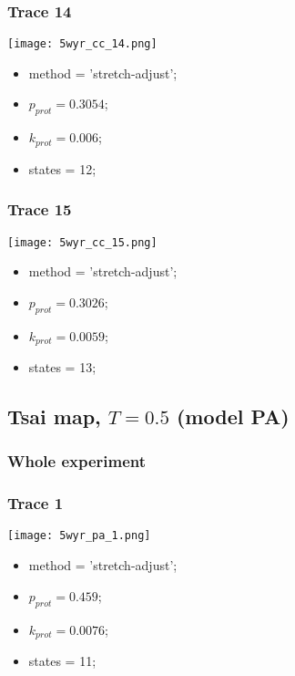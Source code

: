 \subsubsection{Trace 14}
\begin{minipage}[c]{0.7\textwidth}
    \texttt{[image: 5wyr\_cc\_14.png]}
\end{minipage}
\hfill
\begin{minipage}[c]{0.45\textwidth}
    \begin{itemize}
        \item method = 'stretch-adjust';
        \item $p_{prot}=0.3054$;
        \item $k_{prot}=0.006$;
        \item states = 12;
    \end{itemize}
\end{minipage}

\subsubsection{Trace 15}
\begin{minipage}[c]{0.7\textwidth}
    \texttt{[image: 5wyr\_cc\_15.png]}
\end{minipage}
\hfill
\begin{minipage}[c]{0.45\textwidth}
    \begin{itemize}
        \item method = 'stretch-adjust';
        \item $p_{prot}=0.3026$;
        \item $k_{prot}=0.0059$;
        \item states = 13;
    \end{itemize}
\end{minipage}

\subsection{Tsai map, $T=0.5$ (model PA)}
\subsubsection{Whole experiment}

\subsubsection{Trace 1}
\begin{minipage}[c]{0.7\textwidth}
    \texttt{[image: 5wyr\_pa\_1.png]}
\end{minipage}
\hfill
\begin{minipage}[c]{0.45\textwidth}
    \begin{itemize}
        \item method = 'stretch-adjust';
        \item $p_{prot}=0.459$;
        \item $k_{prot}=0.0076$;
        \item states = 11;
    \end{itemize}
\end{minipage}

